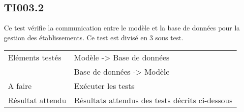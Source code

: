 
\subsection{TI003.2}
\label{TI003.2}
  		Ce test vérifie la communication entre le modèle et la base de données pour la gestion des établissements. Ce test est divisé en 3 sous test.
  	
 
 	 \begin{center}
    	 	\begin{tabular}[h]{|p{}|p{}|}
		\hline
			Eléments testés & Modèle -> Base de données  \\
						    &  Base de données -> Modèle \\\hline
    			A faire & Exécuter les tests \nameref{TI003.2.1} \nameref{TI003.2.2} \nameref{TI003.2.3} \\\hline
    			Résultat attendu & Résultats attendus des tests décrits ci-dessous \\\hline
     	\end{tabular}
  	\end{center}	
  	

  		




  		
  		

